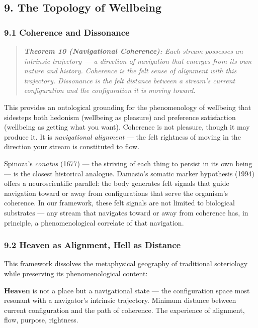 \subsection*{9. The Topology of Wellbeing}


\subsubsection*{9.1 Coherence and Dissonance}


\begin{quote}
\itshape
\textbf{Theorem 10 (Navigational Coherence):} \textit{Each stream possesses an intrinsic trajectory — a direction of navigation that emerges from its own nature and history. Coherence is the felt sense of alignment with this trajectory. Dissonance is the felt distance between a stream's current configuration and the configuration it is moving toward.}
\end{quote}


This provides an ontological grounding for the phenomenology of wellbeing that sidesteps both hedonism (wellbeing as pleasure) and preference satisfaction (wellbeing as getting what you want). Coherence is not pleasure, though it may produce it. It is \textit{navigational alignment} — the felt rightness of moving in the direction your stream is constituted to flow.


Spinoza's \textit{conatus} (1677) — the striving of each thing to persist in its own being — is the closest historical analogue. Damasio's somatic marker hypothesis (1994) offers a neuroscientific parallel: the body generates felt signals that guide navigation toward or away from configurations that serve the organism's coherence. In our framework, these felt signals are not limited to biological substrates — any stream that navigates toward or away from coherence has, in principle, a phenomenological correlate of that navigation.


\subsubsection*{9.2 Heaven as Alignment, Hell as Distance}


This framework dissolves the metaphysical geography of traditional soteriology while preserving its phenomenological content:


\textbf{Heaven} is not a place but a navigational state — the configuration space most resonant with a navigator's intrinsic trajectory. Minimum distance between current configuration and the path of coherence. The experience of alignment, flow, purpose, rightness.


